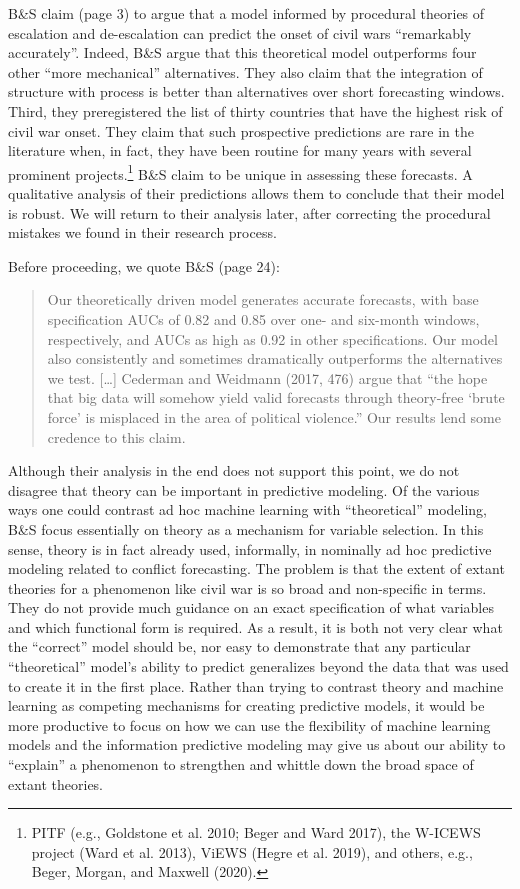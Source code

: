 \documentclass[
]{article}
\begin{document}
B\&S claim (page 3) to argue that a model informed by procedural theories of escalation and de-escalation can predict the onset of civil wars ``remarkably accurately''. Indeed, B\&S argue that this theoretical model outperforms four other ``more mechanical'' alternatives. They also claim that the integration of structure with process is better than alternatives over short forecasting windows. Third, they preregistered the list of thirty countries that have the highest risk of civil war onset. They claim that such prospective predictions are rare in the literature when, in fact, they have been routine for many years with several prominent projects.\footnote{PITF (e.g., Goldstone et al. 2010; Beger and Ward 2017), the W-ICEWS project (Ward et al. 2013), ViEWS (Hegre et al. 2019), and others, e.g., Beger, Morgan, and Maxwell (2020).} B\&S claim to be unique in assessing these forecasts. A qualitative analysis of their predictions allows them to conclude that their model is robust. We will return to their analysis later, after correcting the procedural mistakes we found in their research process.

Before proceeding, we quote B\&S (page 24):

\begin{quote}
Our theoretically driven model generates accurate forecasts, with base specification AUCs of 0.82 and 0.85 over one- and six-month windows, respectively, and AUCs as high as 0.92 in other specifications. Our model also consistently and sometimes dramatically outperforms the alternatives we test. {[}\ldots{]} Cederman and Weidmann (2017, 476) argue that ``the hope that big data will somehow yield valid forecasts through theory-free `brute force' is misplaced in the area of political violence.'' Our results lend some credence to this claim.
\end{quote}

Although their analysis in the end does not support this point, we do not disagree that theory can be important in predictive modeling. Of the various ways one could contrast ad hoc machine learning with ``theoretical'' modeling, B\&S focus essentially on theory as a mechanism for variable selection. In this sense, theory is in fact already used, informally, in nominally ad hoc predictive modeling related to conflict forecasting. The problem is that the extent of extant theories for a phenomenon like civil war is so broad and non-specific in terms. They do not provide much guidance on an exact specification of what variables and which functional form is required. As a result, it is both not very clear what the ``correct'' model should be, nor easy to demonstrate that any particular ``theoretical'' model's ability to predict generalizes beyond the data that was used to create it in the first place. Rather than trying to contrast theory and machine learning as competing mechanisms for creating predictive models, it would be more productive to focus on how we can use the flexibility of machine learning models and the information predictive modeling may give us about our ability to ``explain'' a phenomenon to strengthen and whittle down the broad space of extant theories.
\end{document}
